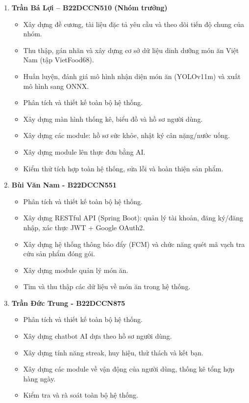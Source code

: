 \documentclass[../main.tex]{subfiles}
\begin{document}
\begin{enumerate}
    \item \textbf{Trần Bá Lợi -- B22DCCN510 (Nhóm trưởng)}
    \begin{itemize}
        \item Xây dựng đề cương, tài liệu đặc tả yêu cầu và theo dõi tiến độ chung của nhóm.
        \item Thu thập, gán nhãn và xây dựng cơ sở dữ liệu dinh dưỡng món ăn Việt Nam (tập VietFood68).
        \item Huấn luyện, đánh giá mô hình nhận diện món ăn (YOLOv11m) và xuất mô hình sang ONNX.
        \item Phân tích và thiết kế toàn bộ hệ thống.
        \item Xây dựng màn hình thống kê, biểu đồ và hồ sơ người dùng.
        \item Xây dựng các module: hồ sơ sức khỏe, nhật ký cân nặng/nước uống.
        \item Xây dựng module lên thực đơn bằng AI.
        \item Kiểm thử tích hợp toàn hệ thống, sửa lỗi và hoàn thiện sản phẩm.
    \end{itemize}

    \item \textbf{Bùi Văn Nam - B22DCCN551}
    \begin{itemize}
        \item Phân tích và thiết kế toàn bộ hệ thống.
        \item Xây dựng RESTful API (Spring Boot): quản lý tài khoản, đăng ký/đăng nhập, xác thực JWT + Google OAuth2.
        \item Xây dựng hệ thống thông báo đẩy (FCM) và chức năng quét mã vạch tra cứu sản phẩm đóng gói.
        \item Xây dựng module quản lý món ăn.
        \item Tìm và thu thập các dữ liệu về món ăn trong hệ thống.
    \end{itemize}
    \vspace{0.3cm}
    \newpage
    \item \textbf{Trần Đức Trung - B22DCCN875}
    \begin{itemize}
        \item Phân tích và thiết kế toàn bộ hệ thống.
        \item Xây dựng chatbot AI dựa theo hồ sơ người dùng.
        \item Xây dựng tính năng streak, huy hiệu, thử thách và kết bạn.
        \item Xây dựng các module về vận động của người dùng, thống kê tổng hợp hàng ngày.
        \item Kiểm tra và rà soát toàn bộ hệ thống.
    \end{itemize}
\end{enumerate}
\end{document}
